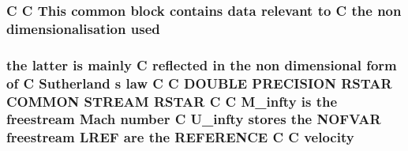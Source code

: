 \hypertarget{msa20_2home_2abonfi_2_c_f_d__codes_2_eul_f_s_83_82_83_2include_2stream_8com_a3291a21585d0aec360cd82d75bf51496}{
\subsubsection[{used}]{\setlength{\rightskip}{0pt plus 5cm}C C This common block contains data relevant to C the non {\bf dimensionalisation} used}}\label{msa20_2home_2abonfi_2_c_f_d__codes_2_eul_f_s_83_82_83_2include_2stream_8com_a3291a21585d0aec360cd82d75bf51496}
\hypertarget{msa20_2home_2abonfi_2_c_f_d__codes_2_eul_f_s_83_82_83_2include_2stream_8com_a4acbada976d4b32776408b1d1e55321a}{
\subsubsection[{velocity}]{\setlength{\rightskip}{0pt plus 5cm}the latter is mainly C reflected in the non dimensional form of C Sutherland s law C C D\-O\-U\-B\-L\-E P\-R\-E\-C\-I\-S\-I\-O\-N R\-S\-T\-A\-R C\-O\-M\-M\-O\-N S\-T\-R\-E\-A\-M R\-S\-T\-A\-R C C {\bf M\-\_\-infty} is the freestream Mach number C {\bf U\-\_\-infty} stores the N\-O\-F\-V\-A\-R freestream {\bf L\-R\-E\-F} {\bf are} the R\-E\-F\-E\-R\-E\-N\-C\-E C C velocity}}\label{msa20_2home_2abonfi_2_c_f_d__codes_2_eul_f_s_83_82_83_2include_2stream_8com_a4acbada976d4b32776408b1d1e55321a}
